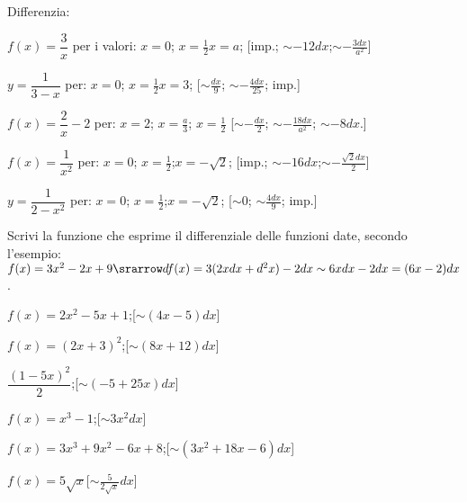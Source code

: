 \begin{esercizio} \label{ese:dif06}
Differenzia:
\begin{enumeratea}
  \item  $f(x)=\dfrac{3}{x}$ per i valori:\hspace{1.5em} $x=0$;
  \hspace{1.5em}  $x=\frac{1}{2}$\hspace{1.5em}$x=a$; 
  \hfill [imp.; $\sim-12dx$;$\sim -\frac{3dx}{a^2}$]
 \item $y=\dfrac{1}{3-x}$ per:\hspace{1.5em} $x=0$;\hspace{1.5em}
  $x=\frac{1}{2}$\hspace{1.5em}$x=3$;
   \hfill [$\sim \frac{dx}{9}$; $\sim -\frac{4dx}{25}$; imp.]
  \item $f(x)=\dfrac{2}{x}-2$ per:\hspace{1.5em} $x=2$;\hspace{1.5em}
  $x=\frac{a}{3}$;  $x=\frac{1}{2}$ 
  \hfill [$\sim -\frac{dx}{2}$; $\sim -\frac{18dx}{a^2}$; $\sim -8dx$.]
  \item $f(x)=\dfrac{1}{x^2}$ per:\hspace{1.5em} $x=0$;\hspace{1.5em}
  $x=\frac{1}{2}$;\hspace{1.5em}$x=-\sqrt{2}$;
  \hfill [imp.; $\sim-16dx$;$\sim -\frac{\sqrt{2}dx}{2}$]
  \item $y=\dfrac{1}{2-x^2}$ per:\hspace{1.5em} $x=0$;\hspace{1.5em}
  $x=\frac{1}{2}$;\hspace{1.5em}$x=-\sqrt{2}$;
   \hfill [$\sim 0$; $\sim \frac{4dx}{9}$; imp.]
 \end{enumeratea} 
\end{esercizio}

\begin{esercizio}\label{ese:dif06}
Scrivi la funzione che esprime il differenziale delle funzioni date, secondo 
l'esempio:\\
$f(x)=3x^2-2x+9\srarrow df(x)= 3(2xdx+d^2x)-2dx\sim 6xdx-2dx = (6x-2)dx$.
 \begin{enumeratea}
  \item $f(x)=2x^2-5x+1$;\hfill [$\sim (4x-5)dx$]
  \item $f(x)=(2x+3)^2$;\hfill [$\sim (8x+12)dx$]
  \item $\dfrac{(1-5x)^2}{2}$;\hfill [$\sim (-5+25x)dx$]
  \item $f(x)=x^3-1$;\hfill [$\sim 3x^2dx$]
  \item $f(x)=3x^3+9x^2-6x+8$;\hfill [$\sim (3x^2+18x-6)dx$]
  \item $f(x)=5\sqrt{x}$\hfill [$\sim \frac{5}{2\sqrt{x}}dx$]
 \end{enumeratea}
\end{esercizio}

